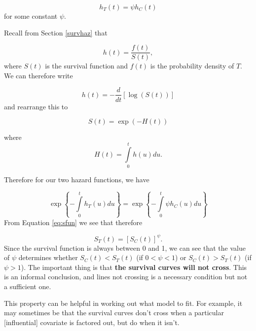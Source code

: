 \documentclass[
  openany]{book}
\theoremstyle{definition}
\theoremstyle{definition}
\theoremstyle{definition}
\theoremstyle{definition}
\theoremstyle{remark}
\begin{document}
\[h_T\left(t\right) = \psi h_C\left(t\right) \]
for some constant \(\psi\).

Recall from Section \ref{survhaz} that

\[h\left(t\right) = \frac{f\left(t\right)}{S\left(t\right)},\]
where \(S\left(t\right)\) is the survival function and \(f\left(t\right)\) is the probability density of \(T\). We can therefore write

\[h\left(t\right) = -\frac{d}{dt}\left[\log\left(S\left(t\right)\right)\right]\]
and rearrange this to

\begin{equation}
S\left(t\right) = \exp \left(-H\left(t\right)\right)
\label{eq:sfun}
\end{equation}

where \[H\left(t\right) = \int\limits_0^t h\left(u\right) du.\]

Therefore for our two hazard functions, we have

\[\exp\left\lbrace - \int\limits_0^t h_T\left(u\right)du \right\rbrace =\exp\left\lbrace -\int\limits_0^t\psi h_C\left(u\right) du \right\rbrace  \]
From Equation \eqref{eq:sfun} we see that therefore

\[S_T\left(t\right) = \left[S_C\left(t\right)\right]^\psi.\]
Since the survival function is always between 0 and 1, we can see that the value of \(\psi\) determines whether \(S_C\left(t\right)<S_T\left(t\right)\) (if \(0<\psi<1\)) or \(S_C\left(t\right)>S_T\left(t\right)\) (if \(\psi>1\)). The important thing is that \textbf{the survival curves will not cross}. This is an informal conclusion, and lines not crossing is a necessary condition but not a sufficient one.

This property can be helpful in working out what model to fit. For example, it may sometimes be that the survival curves don't cross when a particular {[}influential{]} covariate is factored out, but do when it isn't.
\end{document}
